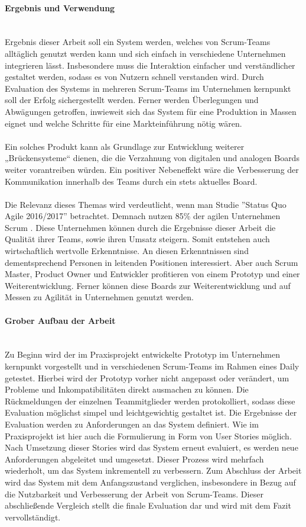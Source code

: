 \documentclass[12pt,titlepage]{scrartcl}
\begin{document}
	\paragraph{Ergebnis und Verwendung} \leavevmode \\
	Ergebnis dieser Arbeit soll ein System werden, welches von Scrum-Teams alltäglich genutzt werden kann und sich einfach in verschiedene Unternehmen integrieren lässt. Insbesondere muss die Interaktion einfacher und verständlicher gestaltet werden, sodass es von Nutzern schnell verstanden wird. Durch Evaluation des Systems in mehreren Scrum-Teams im Unternehmen kernpunkt soll der Erfolg sichergestellt werden. Ferner werden Überlegungen und Abwägungen getroffen, inwieweit sich das System für eine Produktion in Massen eignet und welche Schritte für eine Markteinführung nötig wären. \\ \\
Ein solches Produkt kann als Grundlage zur Entwicklung weiterer „Brückensysteme“ dienen, die die Verzahnung von digitalen und analogen Boards weiter vorantreiben würden. Ein positiver Nebeneffekt wäre die Verbesserung der Kommunikation innerhalb des Teams durch ein stets aktuelles Board. \\ \\
	Die Relevanz dieses Themas wird verdeutlicht, wenn man Studie ''Status Quo Agile 2016/2017'' betrachtet. Demnach nutzen 85\% der agilen Unternehmen Scrum \cite{hskob}. Diese Unternehmen können durch die Ergebnisse dieser Arbeit die Qualität ihrer Teams, sowie ihren Umsatz steigern. Somit entstehen auch wirtschaftlich wertvolle Erkenntnisse.
	An diesen Erkenntnissen sind dementsprechend Personen in leitenden Positionen interessiert. Aber auch Scrum Master, Product Owner und Entwickler profitieren von einem Prototyp und einer Weiterentwicklung. Ferner können diese Boards zur Weiterentwicklung und auf Messen zu Agilität in Unternehmen genutzt werden.
	\paragraph{Grober Aufbau der Arbeit} \leavevmode \\
	Zu Beginn wird der im Praxisprojekt entwickelte Prototyp im Unternehmen kernpunkt vorgestellt und in verschiedenen Scrum-Teams im Rahmen eines Daily getestet. Hierbei wird der Prototyp vorher nicht angepasst oder verändert, um Probleme und Inkompatibilitäten direkt ausmachen zu können. Die Rückmeldungen der einzelnen Teammitglieder werden protokolliert, sodass diese Evaluation möglichst simpel und leichtgewichtig gestaltet ist. Die Ergebnisse der Evaluation werden zu Anforderungen an das System definiert. Wie im Praxisprojekt ist hier auch die Formulierung in Form von User Stories möglich. Nach Umsetzung dieser Stories wird das System erneut evaluiert, es werden neue Anforderungen abgeleitet und umgesetzt. Dieser Prozess wird mehrfach wiederholt, um das System inkrementell zu verbessern. Zum Abschluss der Arbeit wird das System mit dem Anfangszustand verglichen, insbesondere in Bezug auf die Nutzbarkeit und Verbesserung der Arbeit von Scrum-Teams. Dieser abschließende Vergleich stellt die finale Evaluation dar und wird mit dem Fazit vervollständigt.
\end{document}
